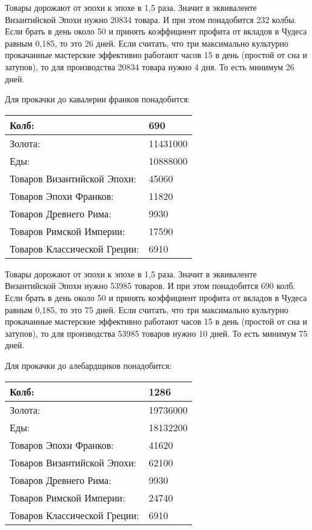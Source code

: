 Товары дорожают от эпохи к эпохе в 1,5 раза.
Значит в эквиваленте Византийской Эпохи нужно 20834 товара.
И при этом понадобится 232 колбы. Если брать в день около 50 и принять коэффициент профита от вкладов
в Чудеса равным 0,185, то это 26 дней.
Если считать, что три максимально культурно прокачанные мастерские эффективно работают часов 15 в день (простой от сна и затупов),
то для производства 20834 товара нужно 4 дня.
То есть минимум 26 дней.


Для прокачки до кавалерии франков понадобится:

\begin{center}
    \begin{tabular}[h!]{|l|l|}
        \hline
        Колб:   & 690 \\\hline
        Золота: & 11431000 \\\hline
        Еды:    & 10888000 \\\hline
        Товаров Византийской Эпохи: & 45060 \\\hline
        Товаров Эпохи Франков: & 11820 \\\hline
        Товаров Древнего Рима: & 9930 \\\hline
        Товаров Римской Империи: & 17590 \\\hline
        Товаров Классической Греции: & 6910 \\\hline
    \end{tabular}
\end{center}

Товары дорожают от эпохи к эпохе в 1,5 раза.
Значит в эквиваленте Византийской Эпохи нужно 53985 товаров.
И при этом понадобится 690 колб. Если брать в день около 50 и принять коэффициент профита от вкладов
в Чудеса равным 0,185, то это 75 дней.
Если считать, что три максимально культурно прокачанные мастерские эффективно работают часов 15 в день (простой от сна и затупов),
то для производства 53985 товаров нужно 10 дней.
То есть минимум 75 дней.


Для прокачки до алебардщиков понадобится:

\begin{center}
    \begin{tabular}[h!]{|l|l|}
        \hline
        Колб:   & 1286 \\\hline
        Золота: & 19736000 \\\hline
        Еды:    & 18132200 \\\hline
        Товаров Эпохи Франков: & 41620 \\\hline
        Товаров Византийской Эпохи: & 62100 \\\hline
        Товаров Древнего Рима: & 9930 \\\hline
        Товаров Римской Империи: & 24740 \\\hline
        Товаров Классической Греции: & 6910 \\\hline
    \end{tabular}
\end{center}

